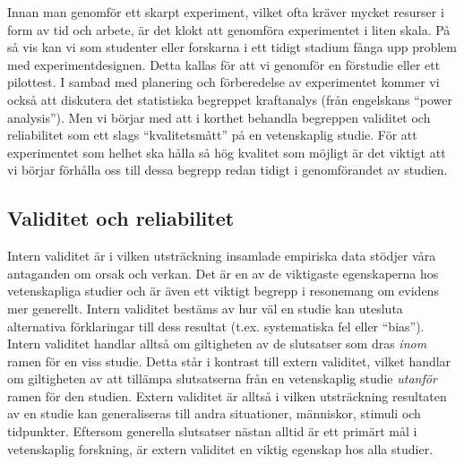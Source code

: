 \documentclass[
]{book}
\begin{document}
Innan man genomför ett skarpt experiment, vilket ofta kräver mycket resurser i form av tid och arbete, är det klokt att genomföra experimentet i liten skala. På så vis kan vi som studenter eller forskarna i ett tidigt stadium fånga upp problem med experimentdesignen. Detta kallas för att vi genomför en förstudie eller ett pilottest. I sambad med planering och förberedelse av experimentet kommer vi också att diskutera det statistiska begreppet kraftanalys (från engelskans ``power analysis''). Men vi börjar med att i korthet behandla begreppen validitet och reliabilitet som ett slags ``kvalitetsmått'' på en vetenskaplig studie. För att experimentet som helhet ska hålla så hög kvalitet som möjligt är det viktigt att vi börjar förhålla oss till dessa begrepp redan tidigt i genomförandet av studien.

\hypertarget{sub07.1.1}{%
\subsection{Validitet och reliabilitet}\label{sub07.1.1}}

Intern validitet är i vilken utsträckning insamlade empiriska data stödjer våra antaganden om orsak och verkan. Det är en av de viktigaste egenskaperna hos vetenskapliga studier och är även ett viktigt begrepp i resonemang om evidens mer generellt. Intern validitet bestäms av hur väl en studie kan utesluta alternativa förklaringar till dess resultat (t.ex. systematiska fel eller ``bias''). Intern validitet handlar alltså om giltigheten av de slutsatser som dras \emph{inom} ramen för en viss studie. Detta står i kontrast till extern validitet, vilket handlar om giltigheten av att tillämpa slutsatserna från en vetenskaplig studie \emph{utanför} ramen för den studien. Extern validitet är alltså i vilken utsträckning resultaten av en studie kan generaliseras till andra situationer, människor, stimuli och tidpunkter. Eftersom generella slutsatser nästan alltid är ett primärt mål i vetenskaplig forskning, är extern validitet en viktig egenskap hos alla studier.
\end{document}
